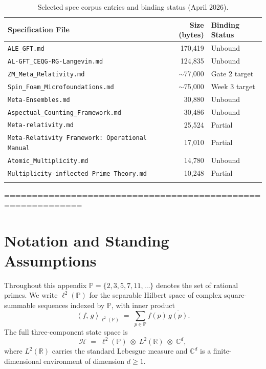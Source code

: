 \documentclass[12pt,letterpaper]{article}
\theoremstyle{definition}
\theoremstyle{remark}
\newcommand{\PP}{\mathbb{P}}
\newcommand{\RR}{\mathbb{R}}
\newcommand{\CC}{\mathbb{C}}
\newcommand{\HH}{\mathcal{H}}
\newcommand{\ip}[2]{\left\langle #1,\, #2 \right\rangle}
\newcommand{\lp}{\ell^2(\PP)}
\newcommand{\Lt}{L^2(\RR)}
\newcommand{\Cd}{\CC^d}
\begin{document}
\begin{longtable}{lrl}
\toprule
\textbf{Specification File} & \textbf{Size (bytes)} & \textbf{Binding Status} \\
\midrule
\texttt{ALE\_GFT.md} & 170,419 & Unbound \\
\texttt{AL-GFT\_CEQG-RG-Langevin.md} & 124,835 & Unbound \\
\texttt{ZM\_Meta\_Relativity.md} & $\sim$77,000 & Gate 2 target \\
\texttt{Spin\_Foam\_Microfoundations.md} & $\sim$75,000 & Week 3 target \\
\texttt{Meta-Ensembles.md} & 30,880 & Unbound \\
\texttt{Aspectual\_Counting\_Framework.md} & 30,486 & Unbound \\
\texttt{Meta-relativity.md} & 25,524 & Partial \\
\texttt{Meta-Relativity Framework: Operational Manual} & 17,010 & Partial \\
\texttt{Atomic\_Multiplicity.md} & 14,780 & Unbound \\
\texttt{Multiplicity-inflected Prime Theory.md} & 10,248 & Partial \\
\bottomrule
\caption{Selected spec corpus entries and binding status (April 2026).}
\end{longtable}

============================================================
\section{Notation and Standing Assumptions}
\label{app:notation}

Throughout this appendix $\PP = \{2,3,5,7,11,\ldots\}$ denotes the set of
rational primes. We write $\lp$ for the separable Hilbert space of complex
square-summable sequences indexed by $\PP$, with inner product
\[
  \ip{f}{g}_{\lp} \;=\; \sum_{p \in \PP} f(p)\,\overline{g(p)}.
\]
The full three-component state space is
\begin{equation}
  \HH \;=\; \lp \;\otimes\; \Lt \;\otimes\; \Cd,
  \label{eq:hilbert}
\end{equation}
where $L^2(\RR)$ carries the standard Lebesgue measure and $\Cd$ is a
finite-dimensional environment of dimension $d \geq 1$.
\end{document}
